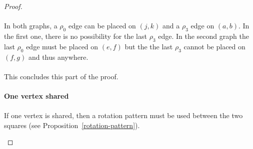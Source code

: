 \begin{proof}
\begin{figure}[H]
\begin{center}
\begin{tikzpicture}[scale=.8]
      \end{tikzpicture}
      \caption{}
    \end{center}
  \end{figure}

  \paragraph{}
  In both graphs, a $\rho_0$ edge can be placed on $(j,k)$ and a $\rho_3$ edge on $(a,b)$. In the first one, there is no possibility for the last $\rho_3$ edge. In the second graph the last $\rho_0$ edge must be placed on $(e,f)$ but the the last $\rho_3$ cannot be placed on $(f,g)$ and thus anywhere.

  \paragraph{}
  This concludes this part of the proof.

  \paragraph{}
  \textbf{One vertex shared}

  \paragraph{}
  If one vertex is shared, then a rotation pattern must be used between the two squares (see Proposition~\ref{rotation-pattern}).

  \begin{figure}[H]
    \begin{center}
\end{center}
\end{figure}
\end{proof}
